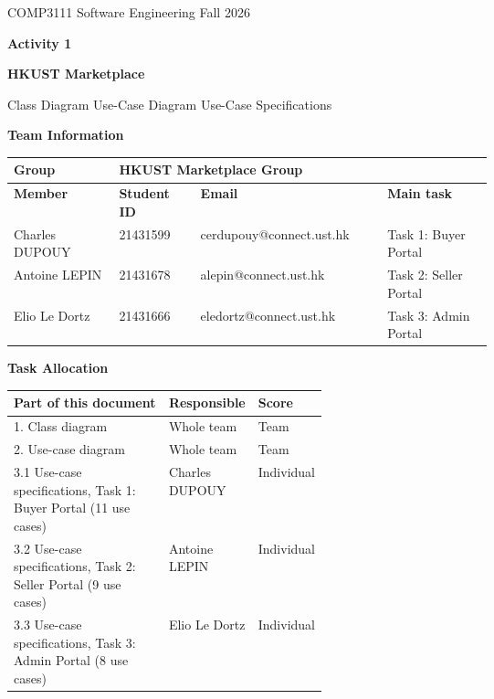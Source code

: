 \documentclass[10pt,a4paper]{article}
\makeatletter
\newcommand{\GroupName}{HKUST Marketplace Group}
\newcommand{\NameA}{Charles DUPOUY}   \newcommand{\IdA}{21431599}   \newcommand{\EmailA}{cerdupouy@connect.ust.hk}   %
\newcommand{\NameB}{Antoine LEPIN}    \newcommand{\IdB}{21431678}   \newcommand{\EmailB}{alepin@connect.ust.hk}      %
\newcommand{\NameC}{Elio Le Dortz}    \newcommand{\IdC}{21431666}   \newcommand{\EmailC}{eledortz@connect.ust.hk}    %
\makeatother
\begin{document}
\thispagestyle{fancy}
\begin{center}
  \vspace*{4mm}
  {\color{darkgray}COMP3111 Software Engineering \textperiodcentered{} Fall 2026}\par\vspace{7mm}
  {\color{ucred}\fontsize{30}{34}\selectfont\bfseries Activity 1}\par\vspace{3mm}
  {\fontsize{20}{24}\selectfont\bfseries HKUST Marketplace}\par\vspace{3mm}
  {\color{darkgray}Class Diagram \textperiodcentered{} Use-Case Diagram \textperiodcentered{} Use-Case Specifications}
\end{center}
\vspace{6mm}

{\color{ucred}\large\bfseries Team Information}\par\vspace{3pt}
\renewcommand{\arraystretch}{1.35}
\begin{tabularx}{\linewidth}{|p{0.22\linewidth}|p{0.17\linewidth}|X|p{0.22\linewidth}|}\hline
\cellcolor{headpink}\textbf{Group} & \multicolumn{3}{l|}{\GroupName}\\\hline
\rowcolor{headpink}\textbf{Member} & \textbf{Student ID} & \textbf{Email} & \textbf{Main task}\\\hline
\NameA & \IdA & \EmailA & Task 1: Buyer Portal\\\hline
\NameB & \IdB & \EmailB & Task 2: Seller Portal\\\hline
\NameC & \IdC & \EmailC & Task 3: Admin Portal\\\hline
\end{tabularx}

\vspace{6mm}
{\color{ucred}\large\bfseries Task Allocation}\par\vspace{3pt}
\begin{tabularx}{\linewidth}{|X|p{0.26\linewidth}|p{0.14\linewidth}|}\hline
\rowcolor{headpink}\textbf{Part of this document} & \textbf{Responsible} & \textbf{Score}\\\hline
1. Class diagram & Whole team & Team\\\hline
2. Use-case diagram & Whole team & Team\\\hline
3.1 Use-case specifications, Task 1: Buyer Portal (11 use cases) & \NameA & Individual\\\hline
3.2 Use-case specifications, Task 2: Seller Portal (9 use cases) & \NameB & Individual\\\hline
3.3 Use-case specifications, Task 3: Admin Portal (8 use cases) & \NameC & Individual\\\hline
\end{tabularx}
\renewcommand{\arraystretch}{1}
\end{document}
